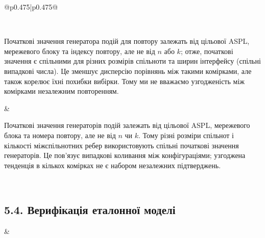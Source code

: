 \documentclass[11pt]{article}
\begin{document}
\begin{longtable}{@{}p{0.475\textwidth}|p{0.475\textwidth}@{}}
\begin{minipage}[t]{\linewidth}
\end{minipage} \\[5mm]
\begin{minipage}[t]{\linewidth}
Початкові значення генератора подій для повтору залежать від цільової ASPL, мережевого блоку та індексу повтору, але не від $n$ або $k$; отже, початкові значення є спільними для різних розмірів спільноти та ширин інтерфейсу (спільні випадкові числа). Це зменшує дисперсію порівнянь між такими комірками, але також корелює їхні похибки вибірки. Тому ми не вважаємо узгодженість між комірками незалежним повторенням.
\end{minipage} &
\begin{minipage}[t]{\linewidth}
Початкові значення генераторів подій залежать від цільової ASPL, мережевого блока та номера повтору, але не від $n$ чи $k$. Тому різні розміри спільнот і кількості міжспільнотних ребер використовують спільні початкові значення генераторів. Це пов'язує випадкові коливання між конфігураціями; узгоджена тенденція в кількох комірках не є набором незалежних підтверджень.
\end{minipage} \\[5mm]
\begin{minipage}[t]{\linewidth}
\subsection*{5.4. Верифікація еталонної моделі}
\end{minipage} &
\begin{minipage}[t]{\linewidth}

\end{minipage}
\end{longtable}
\end{document}
